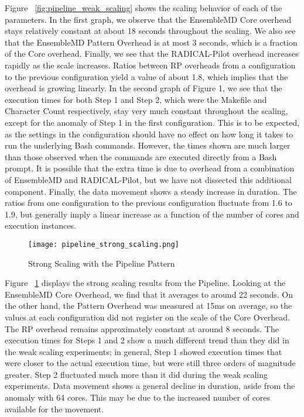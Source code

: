 \documentclass[]{article}
\begin{document}
			Figure ~\ref{fig:pipeline_weak_scaling} shows the scaling behavior of each of the parameters. In the first graph, we observe that the EnsembleMD Core overhead stays relatively constant at about 18 seconds throughout the scaling. We also see that the EnsembleMD Pattern Overhead is at most 3 seconds, which is a fraction of the Core overhead. Finally, we see that the RADICAL-Pilot overhead increases rapidly as the scale increases. Ratios between RP overheads from a configuration to the previous configuration yield a value of about 1.8, which implies that the overhead is growing linearly.
			In the second graph of Figure 1, we see that the execution times for both Step 1 and Step 2, which were the Makefile and Character Count respectively, stay very much constant throughout the scaling, except for the anomaly of Step 1 in the first configuration. This is to be expected, as the settings in the configuration should have no effect on how long it takes to run the underlying Bash commands. However, the times shown are much larger than those observed when the commands are executed directly from a Bash prompt. It is possible that the extra time is due to overhead from a combination of EnsembleMD and RADICAL-Pilot, but we have not dissected this additional component.
			Finally, the data movement shows a steady increase in duration. The ratios from one configuration to the previous configuration fluctuate from 1.6 to 1.9, but generally imply a linear increase as a function of the number of cores and execution instances. 


			\begin{figure}[H]
				\centering
				\texttt{[image: pipeline\_strong\_scaling.png]}
				\caption{Strong Scaling with the Pipeline Pattern}
				\label{fig:pipeline_strong_scaling}
			\end{figure}

			Figure ~\ref{fig:pipeline_strong_scaling} displays the strong scaling results from the Pipeline. Looking at the EnsembleMD Core Overhead, we find that it averages to around 22 seconds. On the other hand, the Pattern Overhead was measured at 15ms on average, so the values at each configuration did not register on the scale of the Core Overhead. The RP overhead remains approximately constant at around 8 seconds. The execution times for Steps 1 and 2 show a much different trend than they did in the weak scaling experiments; in general, Step 1 showed execution times that were closer to the actual execution time, but were still three orders of magnitude greater. Step 2 fluctuated much more than it did during the weak scaling experiments.
			Data movement shows a general decline in duration, aside from the anomaly with 64 cores. This may be due to the increased number of cores available for the movement.
\end{document}
